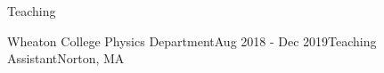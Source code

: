 \documentclass{resume} %
\begin{document}
\begin{rSection}{Teaching}
\begin{rSubsection}{Wheaton College Physics Department}{Aug 2018 - Dec 2019}{Teaching Assistant}{Norton, MA}
\end{rSubsection}


\end{rSection}
\newpage
\end{document}
